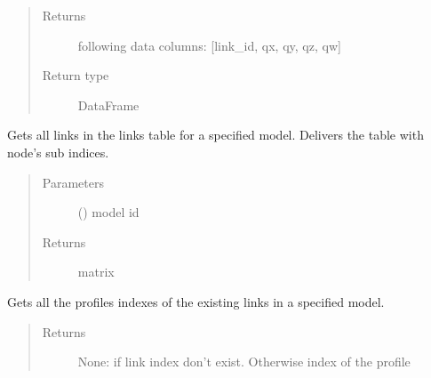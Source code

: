 \documentclass[letterpaper,10pt,english]{sphinxmanual}
\begin{document}
\begin{fulllineitems}
\begin{fulllineitems}
\begin{quote}
\begin{description}
\item[{Returns}] \leavevmode
following data columns: {[}link\_id, qx, qy, qz, qw{]}

\item[{Return type}] \leavevmode
DataFrame

\end{description}\end{quote}

\end{fulllineitems}


\begin{fulllineitems}
\label{\detokenize{api:beamon.database.database.Database.get_all_links}}
Gets all links in the links table for a specified model.
Delivers the table with node’s sub indices.
\begin{quote}\begin{description}
\item[{Parameters}] \leavevmode
{} () \textendash{} model id

\item[{Returns}] \leavevmode
matrix

\end{description}\end{quote}

\end{fulllineitems}


\begin{fulllineitems}
\label{\detokenize{api:beamon.database.database.Database.get_all_links_profile_indexes}}
Gets all the profiles indexes of the existing links in a specified model.
\begin{quote}\begin{description}
\item[{Returns}] \leavevmode
None: if link index don’t exist. Otherwise index of the profile


\end{description}
\end{quote}
\end{fulllineitems}
\end{fulllineitems}
\end{document}
